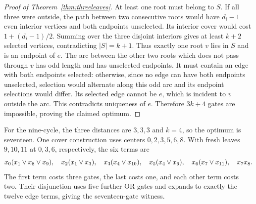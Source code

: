 \begin{proof}[Proof of Theorem~\ref{thm:threeleaves}]
At least one root must belong to $S$. If all three were outside, the path
between two consecutive roots would have $d_i-1$ even interior vertices
and both endpoints unselected. Its interior cover would cost
$1+(d_i-1)/2$. Summing over the three disjoint interiors gives at least
$k+2$ selected vertices, contradicting $|S|=k+1$.
Thus exactly one root $v$ lies in $S$ and is an endpoint of $e$.
The arc between the other two roots which does not pass through $v$ has
odd length and has unselected endpoints. It must contain an edge with both
endpoints selected: otherwise, since no edge can have both endpoints
unselected, selection would alternate along this odd arc and its endpoint
selections would differ. Its selected edge cannot be $e$, which is incident
to $v$ outside the arc. This contradicts uniqueness of $e$.
Therefore $3k+4$ gates are impossible, proving the claimed optimum.
\end{proof}

For the nine-cycle, the three distances are $3,3,3$ and $k=4$, so the
optimum is seventeen. One cover construction uses centers
$0,2,3,5,6,8$. With fresh leaves $9,10,11$ at $0,3,6$, respectively,
the six terms are
\[
 x_0(x_1\mathbin{\vee} x_8\mathbin{\vee} x_9),\quad x_2(x_1\mathbin{\vee} x_3),\quad
 x_3(x_4\mathbin{\vee} x_{10}),\quad x_5(x_4\mathbin{\vee} x_6),\quad
 x_6(x_7\mathbin{\vee} x_{11}),\quad x_7x_8.
\]
The first term costs three gates, the last costs one, and each other term
costs two. Their disjunction uses five further OR gates and expands to
exactly the twelve edge terms, giving the seventeen-gate witness.
